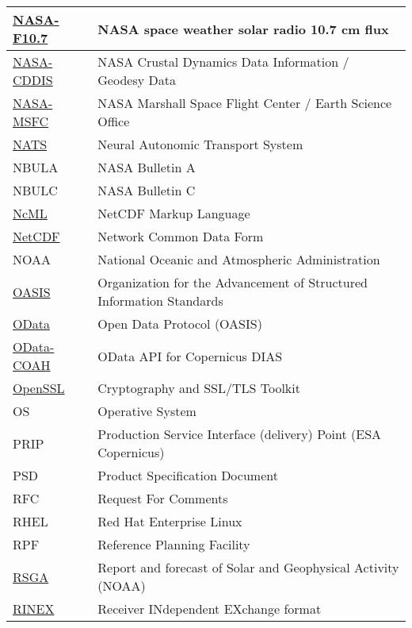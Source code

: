 \documentclass[dec_sum_main.tex]{subfiles}
\begin{document}
\begin{longtable}{|m{2.8cm}|m{10cm}|}
     \href{https://www.nasa.gov/msfcsolar}{NASA-F10.7} & NASA space weather solar radio 10.7 cm flux \\ \hline
    \href{https://cddis.nasa.gov/About/Background.html}{NASA-CDDIS} & NASA Crustal Dynamics Data Information / Geodesy Data \\ \hline      
    \href{https://weather.msfc.nasa.gov/}{NASA-MSFC} & NASA Marshall Space Flight Center / Earth Science Office \\ \hline 
    \href{https://docs.nats.io/reference/faq}{NATS} & Neural Autonomic Transport System \\ \hline
    NBULA & NASA Bulletin A \\ \hline
    NBULC & NASA Bulletin C \\ \hline
    \href{https://www.unidata.ucar.edu/software/netcdf-java/v4.6/ncml/index.htm}{NcML} & NetCDF Markup Language \\ \hline
    \href{https://www.unidata.ucar.edu/software/netcdf/}{NetCDF} & Network Common Data Form \\ \hline
	NOAA & National Oceanic and Atmospheric Administration \\ \hline
	\href{https://www.oasis-open.org/}{OASIS} & Organization for the Advancement of Structured Information Standards \\ \hline
	\href{https://www.odata.org/documentation/}{OData} & Open Data Protocol (OASIS) \\ \hline
    \href{https://scihub.copernicus.eu/twiki/do/view/SciHubUserGuide/ODataAPI?redirectedfrom=SciHubUserGuide.7ODataAPI}{OData-COAH} & OData API for Copernicus DIAS \\ \hline
    \href{https://wiki.openssl.org/index.php/Main_Page}{OpenSSL} & Cryptography and SSL/TLS Toolkit \\ \hline    
	OS & Operative System \\ \hline
	PRIP & Production Service Interface (delivery) Point (ESA Copernicus) \\ \hline
    PSD & Product Specification Document \\ \hline
	RFC & Request For Comments \\ \hline
	RHEL & Red Hat Enterprise Linux \\ \hline
    RPF & Reference Planning Facility \\ \hline
	\href{https://www.swpc.noaa.gov/products/solar-and-geophysical-activity-summary}{RSGA} & Report and forecast of Solar and Geophysical Activity  (NOAA)\\ \hline
	\href{https://www.igs.org/wg/rinex/#documents-formats}{RINEX} & Receiver INdependent EXchange format \\ \hline

\end{longtable}
\end{document}
